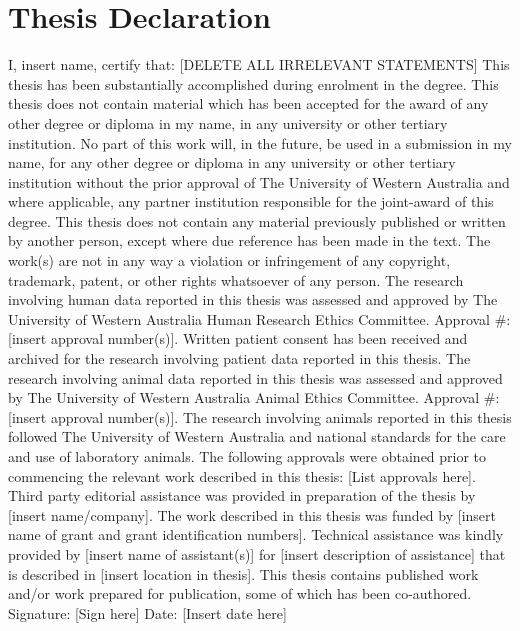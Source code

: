 \section*{Thesis Declaration}
\vskip 0.8cm
\begin{flushleft}
I, insert name, certify that: [DELETE ALL IRRELEVANT STATEMENTS]
\vskip 0.5cm 
This thesis has been substantially accomplished during enrolment in the degree.
\vskip 0.25cm
This thesis does not contain material which has been accepted for the award of any other degree or diploma in my name, in any university or other tertiary institution.
\vskip 0.25cm
No part of this work will, in the future, be used in a submission in my name, for any other degree or diploma in any university or other tertiary institution without the prior approval of The University of Western Australia and where applicable, any partner institution responsible for the joint-award of this degree.
\vskip 0.25cm
This thesis does not contain any material previously published or written by another person, except where due reference has been made in the text. 
\vskip 0.25cm
The work(s) are not in any way a violation or infringement of any copyright, trademark, patent, or other rights whatsoever of any person.
\vskip 0.25cm
The research involving human data reported in this thesis was assessed and approved by The University of Western Australia Human Research Ethics Committee. Approval \#: [insert approval number(s)].
\vskip 0.25cm
Written patient consent has been received and archived for the research involving patient data reported in this thesis.
\vskip 0.25cm
The research involving animal data reported in this thesis was assessed and approved by The University of Western Australia Animal Ethics Committee. Approval \#: [insert approval number(s)].
\vskip 0.25cm
The research involving animals reported in this thesis followed The University of Western Australia and national standards for the care and use of laboratory animals.
\vskip 0.25cm
The following approvals were obtained prior to commencing the relevant work described in this thesis: [List approvals here].
\vskip 0.25cm
Third party editorial assistance was provided in preparation of the thesis by [insert name/company].
\vskip 0.25cm
The work described in this thesis was funded by [insert name of grant and grant identification numbers].
\vskip 0.25cm
Technical assistance was kindly provided by [insert name of assistant(s)] for [insert description of assistance] that is described in [insert location in thesis].
\vskip 0.25cm
This thesis contains published work and/or work prepared for publication, some of which has been co-authored. 
\vskip 0.5cm
Signature: [Sign here]
\vskip 0.25cm
Date: [Insert date here]
\end{flushleft}